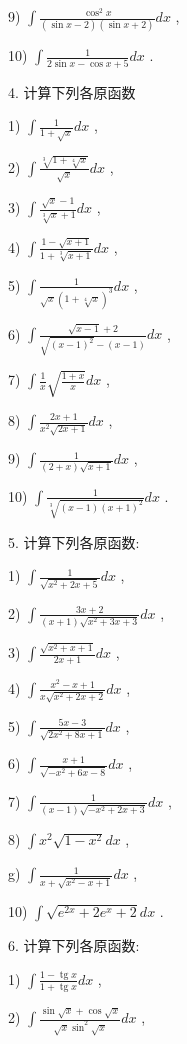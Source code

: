 9) $\int \frac{{\cos }^{2}x}{\left( {\sin x - 2}\right) \left( {\sin x + 2}\right) }{dx}$ ,

10) $\int \frac{1}{2\sin x - \cos x + 5}{dx}$ .

4. 计算下列各原函数

1) $\int \frac{1}{1 + \sqrt{x}}{dx}$ ,

2) $\int \frac{\sqrt[3]{1 + \sqrt[4]{x}}}{\sqrt{x}}{dx}$ ,

3) $\int \frac{\sqrt{x} - 1}{\sqrt[3]{x} + 1}{dx}$ ,

4) $\int \frac{1 - \sqrt{x + 1}}{1 + \sqrt[3]{x + 1}}{dx}$ ,

5) $\int \frac{1}{\sqrt{x}{\left( 1 + \sqrt[4]{x}\right) }^{3}}{dx}$ ,

6) $\int \frac{\sqrt{x - 1} + 2}{\sqrt{{\left( x - 1\right) }^{2}} - \left( {x - 1}\right) }{dx}$ ,

7) $\int \frac{1}{x}\sqrt{\frac{1 + x}{x}}{dx}$ ,

8) $\int \frac{{2x} + 1}{{x}^{2}\sqrt{{2x} + 1}}{dx}$ ,

9) $\int \frac{1}{\left( {2 + x}\right) \sqrt{x + 1}}{dx}$ ,

10) $\int \frac{1}{\sqrt[3]{\left( {x - 1}\right) {\left( x + 1\right) }^{2}}}{dx}$ .

5. 计算下列各原函数:

1) $\int \frac{1}{\sqrt{{x}^{2} + {2x} + 5}}{dx}$ ,

2) $\int \frac{{3x} + 2}{\left( {x + 1}\right) \sqrt{{x}^{2} + {3x} + 3}}{dx}$ ,

3) $\int \frac{\sqrt{{x}^{2} + x + 1}}{{2x} + 1}{dx}$ ,

4) $\int \frac{{x}^{2} - x + 1}{x\sqrt{{x}^{2} + {2x} + 2}}{dx}$ ,

5) $\int \frac{{5x} - 3}{\sqrt{2{x}^{2} + {8x} + 1}}{dx}$ ,

6) $\int \frac{x + 1}{\sqrt{-{x}^{2} + {6x} - 8}}{dx}$ ,

7) $\int \frac{1}{\left( {x - 1}\right) \sqrt{-{x}^{2} + {2x} + 3}}{dx}$ ,

8) $\int {x}^{2}\sqrt{1 - {x}^{2}}{dx}$ ,

g) $\int \frac{1}{x + \sqrt{{x}^{2} - x + 1}}{dx}$ ,

10) $\int \sqrt{{e}^{2x} + 2{e}^{x} + 2}{dx}$ .

6. 计算下列各原函数:

1) $\int \frac{1 - \operatorname{tg}x}{1 + \operatorname{tg}x}{dx}$ ,

2) $\int \frac{\sin \sqrt{x} + \cos \sqrt{x}}{\sqrt{x}{\sin }^{2}\sqrt{x}}{dx}$ ,

